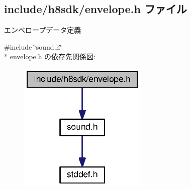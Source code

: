 \subsection{include/h8sdk/envelope.h ファイル}
\label{envelope_8h}


エンベロープデータ定義  


{\ttfamily \#include \char`\"{}sound.\+h\char`\"{}}\\*
envelope.\+h の依存先関係図\+:
\nopagebreak
\begin{figure}[H]
\begin{center}
\leavevmode
\includegraphics[width=173pt]{d2/dbf/envelope_8h__incl}
\end{center}
\end{figure}
